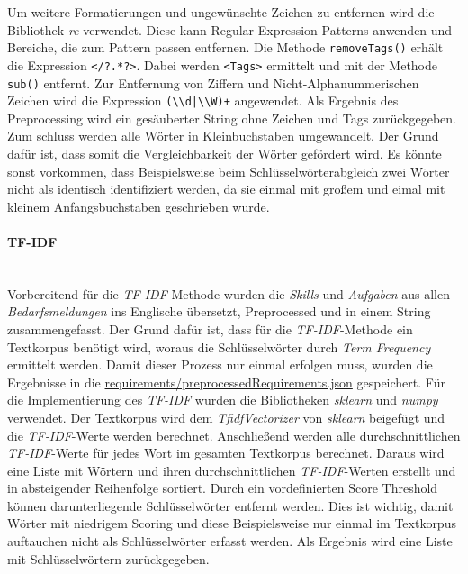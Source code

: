 Um weitere Formatierungen und ungewünschte Zeichen zu entfernen wird die Bibliothek \emph{re} verwendet. Diese kann Regular Expression-Patterns anwenden und Bereiche, die zum Pattern passen entfernen.
%	
Die Methode \lstinline{removeTags()} erhält die Expression \lstinline{</?.*?>}. Dabei werden \lstinline{<Tags>} ermittelt und mit der Methode \lstinline{sub()} entfernt. Zur Entfernung von Ziffern und Nicht-Alphanummerischen Zeichen wird die Expression \lstinline{(\\d|\\W)+} angewendet. Als Ergebnis des Preprocessing wird ein gesäuberter String ohne Zeichen und Tags zurückgegeben. Zum schluss werden alle Wörter in Kleinbuchstaben umgewandelt. Der Grund dafür ist, dass somit die Vergleichbarkeit der Wörter gefördert wird. Es könnte sonst vorkommen, dass Beispielsweise beim Schlüsselwörterabgleich zwei Wörter nicht als identisch identifiziert werden, da sie einmal mit großem und eimal mit kleinem Anfangsbuchstaben geschrieben wurde.
\paragraph{TF-IDF}\mbox{}\\
Vorbereitend für die \emph{TF-IDF}-Methode wurden die \emph{Skills} und \emph{Aufgaben} aus allen \emph{Bedarfsmeldungen} ins Englische übersetzt, Preprocessed und in einem String zusammengefasst. Der Grund dafür ist, dass für die \emph{TF-IDF}-Methode ein Textkorpus benötigt wird, woraus die Schlüsselwörter durch \emph{Term Frequency} ermittelt werden. Damit dieser Prozess nur einmal erfolgen muss, wurden die Ergebnisse in die \url{requirements/preprocessedRequirements.json} gespeichert. Für die Implementierung des \emph{TF-IDF} wurden die Bibliotheken \emph{sklearn} und \emph{numpy} verwendet. Der Textkorpus wird dem \emph{TfidfVectorizer} von \emph{sklearn} beigefügt und die \emph{TF-IDF}-Werte werden berechnet. Anschließend werden alle durchschnittlichen \emph{TF-IDF}-Werte für jedes Wort im gesamten Textkorpus berechnet. Daraus wird eine Liste mit Wörtern und ihren durchschnittlichen \emph{TF-IDF}-Werten erstellt und in absteigender Reihenfolge sortiert. Durch ein vordefinierten Score Threshold können darunterliegende Schlüsselwörter entfernt werden. Dies ist wichtig, damit Wörter mit niedrigem Scoring und diese Beispielsweise nur einmal im Textkorpus auftauchen nicht als Schlüsselwörter erfasst werden. Als Ergebnis wird eine Liste mit Schlüsselwörtern zurückgegeben.

